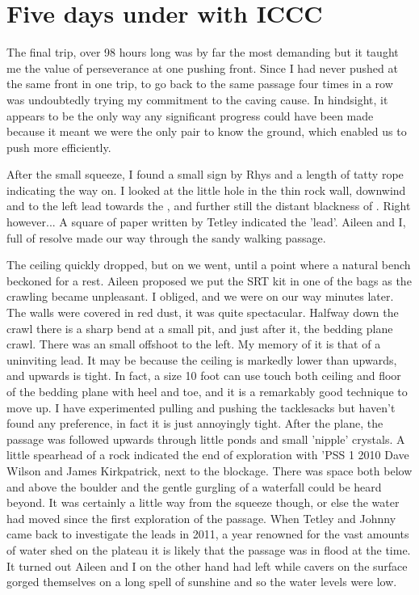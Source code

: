 \section{Five days under with ICCC}
The final trip, over 98 hours long was by far the most demanding but it taught me the value of perseverance at one pushing front. Since I had never pushed at the same front in one trip, to go back to the same passage four times in a row was undoubtedly trying my commitment to the caving cause. In hindsight, it appears to be the only way any significant progress could have been made because it meant we were the only pair to know the ground, which enabled us to push more efficiently.

After the small squeeze, I found a small sign by Rhys and a length of tatty rope indicating the way on. I looked at the little hole in the thin rock wall, downwind and to the left lead towards the , and further still the distant blackness of . Right however... A square of paper written by Tetley indicated the  'lead'.  Aileen and I, full of resolve made our way through the sandy walking passage.

The ceiling quickly dropped, but on we went, until a point where a natural bench beckoned for a rest. Aileen proposed we put the SRT kit in one of the bags as the crawling became unpleasant. I obliged, and we were on our way minutes later. The walls were covered in red dust, it was quite spectacular. Halfway down the crawl there is a sharp bend at a small pit, and just after it, the bedding plane crawl. There was an small offshoot to the left. My memory of it is that of a uninviting lead. It may be because the ceiling is markedly lower than upwards, and upwards is tight. In fact, a size 10 foot can use touch both ceiling and floor of the bedding plane with heel and toe, and it is a remarkably good technique to move up. I have experimented pulling and pushing the tacklesacks but haven't found any preference, in fact it is just annoyingly tight. After the plane, the passage was followed upwards through little ponds and small 'nipple' crystals. A little spearhead of a rock indicated the end of exploration with 'PSS  1 2010 Dave Wilson and James Kirkpatrick, next to the blockage.
There was space both below and above the boulder and the gentle gurgling of a waterfall could be heard beyond. It was certainly a little way from the squeeze though, or else the water had moved since the first exploration of the passage. When Tetley and Johnny came back to investigate the leads in 2011, a year renowned for the vast amounts of water shed on the plateau it is likely that the passage was in flood at the time. It turned out Aileen and I on the other hand had left while cavers on the surface gorged themselves on a long spell of sunshine and so the water levels were low.

